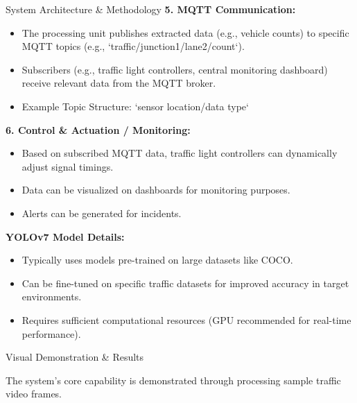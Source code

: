 \documentclass[final]{beamer}
\newlength{\colwidth}
\begin{document}
\begin{frame}[t]
\begin{columns}[t]
\begin{column}{\colwidth}
\begin{block}{System Architecture \& Methodology}
    \textbf{5. MQTT Communication:}
    \begin{itemize}
      \item The processing unit publishes extracted data (e.g., vehicle counts) to specific MQTT topics (e.g., `traffic/junction1/lane2/count`).
      \item Subscribers (e.g., traffic light controllers, central monitoring dashboard) receive relevant data from the MQTT broker.
      \item Example Topic Structure: `sensor location/data type` 
    \end{itemize}

    \textbf{6. Control \& Actuation / Monitoring:}
    \begin{itemize}
      \item Based on subscribed MQTT data, traffic light controllers can dynamically adjust signal timings.
      \item Data can be visualized on dashboards for monitoring purposes.
      \item Alerts can be generated for incidents.
    \end{itemize}

    \textbf{YOLOv7 Model Details:}
    \begin{itemize}
      \item Typically uses models pre-trained on large datasets like COCO.
      \item Can be fine-tuned on specific traffic datasets for improved accuracy in target environments.
      \item Requires sufficient computational resources (GPU recommended for real-time performance).
    \end{itemize}
  \end{block}

  \begin{block}{Visual Demonstration \& Results}
    
    The system's core capability is demonstrated through processing sample traffic video frames.
    

\end{block}
\end{column}
\end{columns}
\end{frame}
\end{document}
